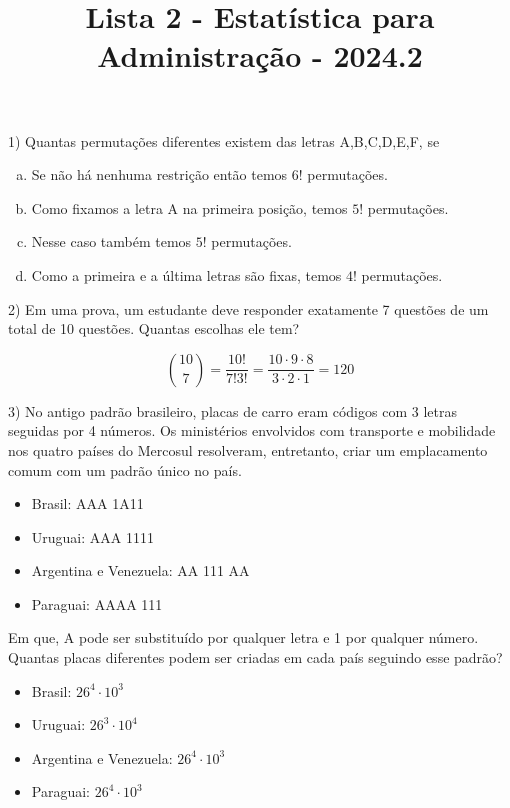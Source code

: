 \documentclass{article}
\title{Lista 2 - Estatística para Administração - 2024.2}
\begin{document}
\date{}
\maketitle

1) Quantas permutações diferentes existem das letras A,B,C,D,E,F, se
\begin{enumerate}[a)] %
    \item Se não há nenhuma restrição então temos $6!$ permutações.
    \item Como fixamos a letra A na primeira posição, temos $5!$ permutações.
    \item Nesse caso também temos $5!$ permutações.
    \item Como a primeira e a última letras são fixas, temos $4!$ permutações.
\end{enumerate}

\vspace{5px}

2) Em uma prova, um estudante deve responder exatamente 7 questões de um total de 10 questões. Quantas escolhas ele tem?

$$\binom{10}{7} =\dfrac{10!}{7!3!} = \dfrac{10 \cdot 9 \cdot 8}{3 \cdot 2 \cdot 1} = 120$$
\vspace{5px}

3) No antigo padrão brasileiro, placas de carro eram códigos com 3 letras seguidas por 4 números. Os ministérios envolvidos com transporte e mobilidade nos quatro países do Mercosul resolveram, entretanto, criar um emplacamento comum com um padrão único no país.
\begin{itemize}
    \item Brasil: AAA 1A11
    \item Uruguai: AAA 1111
    \item Argentina e Venezuela: AA 111 AA
    \item Paraguai: AAAA 111
\end{itemize}

Em que, A pode ser substituído por qualquer letra e 1 por qualquer número. Quantas placas diferentes podem ser criadas em cada país seguindo esse padrão?

\begin{itemize}
    \item Brasil: $26^4 \cdot 10^3$
    \item Uruguai: $26^3 \cdot 10^4$
    \item Argentina e Venezuela: $26^4 \cdot 10^3$ 
    \item Paraguai: $26^4 \cdot 10^3$
\end{itemize}
\vspace{5px}
\end{document}
